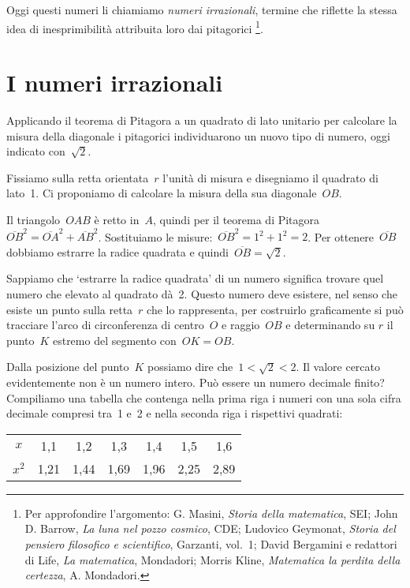 Oggi questi numeri li chiamiamo \emph{numeri irrazionali}, termine che
riflette la stessa idea di inesprimibilità attribuita loro dai
pitagorici \footnote{Per approfondire l'argomento: G. Masini, \textit{Storia
della matematica}, SEI; John D. Barrow, \textit{La luna nel pozzo
cosmico}, CDE; Ludovico Geymonat, \textit{Storia del pensiero
filosofico e scientifico}, Garzanti, vol.~1; David Bergamini e redattori
di Life, \textit{La matematica}, Mondadori; Morris Kline,
\textit{Matematica la perdita della certezza}, A. Mondadori.}.

\section{I numeri irrazionali}
Applicando il teorema di Pitagora a un quadrato di lato unitario per
calcolare la misura della diagonale i pitagorici individuarono un nuovo
tipo di numero, oggi indicato con~\(\sqrt{2}\).

Fissiamo sulla retta orientata~\(r\) l'unità di misura e disegniamo il quadrato 
di lato~1. Ci proponiamo di calcolare la misura della sua diagonale~\(OB\).

\begin{center}
 
\end{center}

Il triangolo~\(OAB\) è retto in~\(A\), quindi per il teorema di
Pitagora~\(\overline{OB}^{2}=\overline{OA}^{2}+\overline{AB}^{2}\).
Sostituiamo le misure:~\(\overline{OB}^{2}=1^2+1^2=2\). 
Per ottenere~\(\overline{OB}\)
dobbiamo estrarre la radice quadrata e quindi~\(\overline{OB}=\sqrt{2}\).

Sappiamo che `estrarre la radice quadrata' di un numero significa trovare 
quel numero che elevato al quadrato dà~2. Questo numero deve esistere, 
nel senso che esiste un punto sulla retta~\(r\) che lo rappresenta, 
per costruirlo graficamente si può tracciare l'arco di circonferenza di 
centro~\(O\) e raggio~\(OB\) e determinando su \(r\) il punto~\(K\) estremo 
del segmento con~\(OK = OB\).

Dalla posizione del punto~\(K\) possiamo dire che~\(1<\sqrt{2}<2\). Il
valore cercato evidentemente non è un numero intero. Può essere un
numero decimale finito? Compiliamo una tabella che contenga nella prima
riga i numeri con una sola cifra decimale compresi tra~1 e~2 e nella
seconda riga i rispettivi quadrati:

\begin{center}
\begin{tabular}{ccccccc}
\toprule
\(x\) & 1,1 & 1,2 & 1,3 & 1,4 & 1,5 & 1,6\\
\(x^{2}\) & 1,21 & 1,44 & 1,69 & 1,96 & 2,25 & 2,89\\
\bottomrule
\end{tabular}
\end{center}

